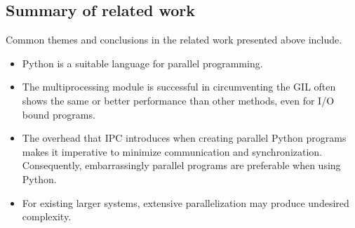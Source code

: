 \subsection{Summary of related work}
Common themes and conclusions in the related work presented above include.

\begin{itemize}
  \item Python is a suitable language for parallel programming.
  \item The multiprocessing module is successful in circumventing the GIL often shows the same or better performance than other
    methods, even for I/O bound programs.
  \item The overhead that IPC introduces when creating parallel Python programs makes it imperative to minimize communication and
    synchronization. Consequently, embarrassingly parallel programs are preferable when using Python.
  \item For existing larger systems, extensive parallelization may produce undesired complexity.
\end{itemize}
